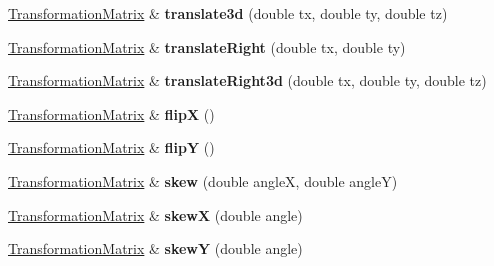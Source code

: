 \begin{DoxyCompactItemize}
\mbox{\hyperlink{class_web_core_1_1_transformation_matrix}{Transformation\+Matrix}} \& {\bfseries translate3d} (double tx, double ty, double tz)
\item 
\mbox{\label{class_web_core_1_1_transformation_matrix_aabcc34f0248bab8c55fdb57a45e726bf}} 
\mbox{\hyperlink{class_web_core_1_1_transformation_matrix}{Transformation\+Matrix}} \& {\bfseries translate\+Right} (double tx, double ty)
\item 
\mbox{\label{class_web_core_1_1_transformation_matrix_afbe138630d468c25799f4a84775cf11f}} 
\mbox{\hyperlink{class_web_core_1_1_transformation_matrix}{Transformation\+Matrix}} \& {\bfseries translate\+Right3d} (double tx, double ty, double tz)
\item 
\mbox{\label{class_web_core_1_1_transformation_matrix_a09d9706567125e3101c2dbe68048545f}} 
\mbox{\hyperlink{class_web_core_1_1_transformation_matrix}{Transformation\+Matrix}} \& {\bfseries flipX} ()
\item 
\mbox{\label{class_web_core_1_1_transformation_matrix_a4e5ac5bc77ec3d07266836d5fb3e10af}} 
\mbox{\hyperlink{class_web_core_1_1_transformation_matrix}{Transformation\+Matrix}} \& {\bfseries flipY} ()
\item 
\mbox{\label{class_web_core_1_1_transformation_matrix_a735fbb626143164f11164ec434700f06}} 
\mbox{\hyperlink{class_web_core_1_1_transformation_matrix}{Transformation\+Matrix}} \& {\bfseries skew} (double angleX, double angleY)
\item 
\mbox{\label{class_web_core_1_1_transformation_matrix_a0e23e5d444015d0abe2148ac0289e64e}} 
\mbox{\hyperlink{class_web_core_1_1_transformation_matrix}{Transformation\+Matrix}} \& {\bfseries skewX} (double angle)
\item 
\mbox{\label{class_web_core_1_1_transformation_matrix_a313d27ff9b3a1f4f610cbf50ad7f2e3c}} 
\mbox{\hyperlink{class_web_core_1_1_transformation_matrix}{Transformation\+Matrix}} \& {\bfseries skewY} (double angle)

\end{DoxyCompactItemize}
